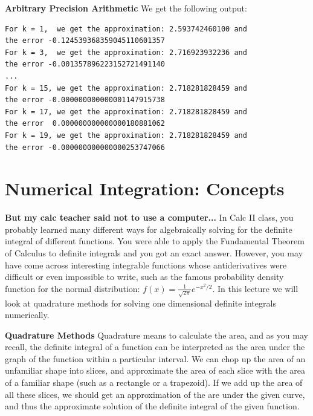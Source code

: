 \documentclass[xcolor=dvipsnames]{beamer}
\begin{document}
\begin{frame}[fragile]
{\bf Arbitrary Precision Arithmetic}
We get the following output:
\begin{verbatim}
For k = 1,  we get the approximation: 2.593742460100 and 
the error -0.124539368359045110601357 
For k = 3,  we get the approximation: 2.716923932236 and 
the error -0.001357896223152721491140 
...
For k = 15, we get the approximation: 2.718281828459 and 
the error -0.000000000000001147915738 
For k = 17, we get the approximation: 2.718281828459 and 
the error  0.000000000000000180881062 
For k = 19, we get the approximation: 2.718281828459 and 
the error -0.000000000000000253747066
\end{verbatim}
\end{frame}

\section{Numerical Integration: Concepts}
\begin{frame}[fragile]
{\bf But my calc teacher said not to use a computer...}
In Calc II class, you probably learned many different ways for algebraically solving for the definite integral of different functions. You were able to apply the Fundamental Theorem of Calculus to definite integrals and you got an exact answer. 
\vfill \pause 
However, you may have come across interesting integrable functions whose antiderivatives were difficult or even impossible to write, such as the famous probability density function for the normal distribution: $f(x)= \displaystyle \frac{1}{\sqrt{2 \pi}}e^{-x^2/2}$. 
\vfill \pause
In this lecture we will look at quadrature methods for solving one dimensional definite integrals numerically.\\
\end{frame}

\begin{frame}[fragile]
{\bf Quadrature Methods}
Quadrature means to calculate the area, and as you may recall, the definite integral of a function can be interpreted as the area under the graph of the function within a particular interval. \vfill \pause We can chop up the area of an unfamiliar shape into slices, and approximate the area of each slice with the area of a familiar shape (such as a rectangle or a trapezoid). \vfill \pause 
If we add up the area of all these slices, we should get an approximation of the are under the given curve, and thus the approximate solution of the definite integral of the given function.\\
\end{frame}
\end{document}
